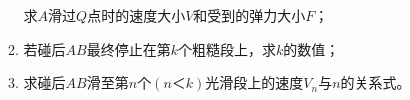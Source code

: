 \begin{enumerate}[leftmargin=0em]
\begin{enumerate}
求$ A $滑过$ Q $点时的速度大小$ V $和受到的弹力大小$ F $；


\item 
若碰后$ AB $最终停止在第$ k $个粗糙段上，求$ k $的数值；


\item 
求碰后$ AB $滑至第$ n $个$ (n ＜ k) $光滑段上的速度$ V_n $与$ n $的关系式。


\end{enumerate}
\begin{figure}[h!]
\flushright

\end{figure}









\end{enumerate}


